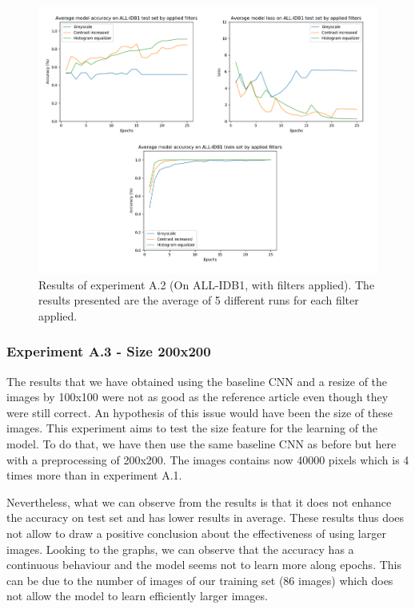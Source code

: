 \documentclass[11pt, openany]{report}
\theoremstyle{plain}
\theoremstyle{definition}
\theoremstyle{remark}
\begin{document}
\begin{figure}[H]
  \centering
  \includegraphics[scale=0.5]{Code/ch6-LeukemiaSubtypes/figures_result/ALL_IDB1/all_idb1-filters.PNG}
  \caption{Results of experiment A.2 (On ALL-IDB1, with filters applied). The results presented are the average of 5 different runs for each filter applied.}
  \label{fig:results-A2}
\end{figure}

\subsubsection{Experiment A.3 - Size 200x200} \label{sec:size-allidb1}
The results that we have obtained using the baseline CNN and a resize of the images by 100x100 were not as good as the reference article \cite{leukemia} even though they were still correct. An hypothesis of this issue would have been the size of these images. This experiment aims to test the size feature for the learning of the model. To do that, we have then use the same baseline CNN as before but here with a preprocessing of 200x200. The images contains now 40000 pixels which is 4 times more than in experiment A.1.

Nevertheless, what we can observe from the results is that it does not enhance the accuracy on test set and has lower results in average. These results thus does not allow to draw a positive conclusion about the effectiveness of using larger images. Looking to the graphs, we can observe that the accuracy has a continuous behaviour and the model seems not to learn more along epochs. This can be due to the number of images of our training set (86 images) which does not allow the model to learn efficiently larger images. 
\end{document}
